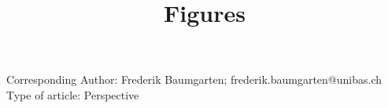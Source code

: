 \documentclass{article}
\begin{document}
	
	
		\title{Figures %
		
		
		
		
	
	} 
	
	\maketitle
	
	
	
	
	
	Corresponding Author: Frederik Baumgarten; frederik.baumgarten@unibas.ch \\
	Type of article: Perspective\\
	

	
	
\end{document}

